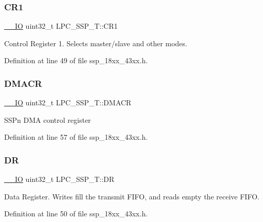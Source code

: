 \subsubsection{\texorpdfstring{C\+R1}{CR1}}
{\footnotesize\ttfamily \hyperlink{core__sc300_8h_aec43007d9998a0a0e01faede4133d6be}{\+\_\+\+\_\+\+IO} uint32\+\_\+t L\+P\+C\+\_\+\+S\+S\+P\+\_\+\+T\+::\+C\+R1}

Control Register 1. Selects master/slave and other modes. 

Definition at line 49 of file ssp\+\_\+18xx\+\_\+43xx.\+h.

\mbox{\label{struct_l_p_c___s_s_p___t_a6a74b0cbac37f424e198ccef9a208d65}} 
\subsubsection{\texorpdfstring{D\+M\+A\+CR}{DMACR}}
{\footnotesize\ttfamily \hyperlink{core__sc300_8h_aec43007d9998a0a0e01faede4133d6be}{\+\_\+\+\_\+\+IO} uint32\+\_\+t L\+P\+C\+\_\+\+S\+S\+P\+\_\+\+T\+::\+D\+M\+A\+CR}

S\+S\+Pn D\+MA control register 

Definition at line 57 of file ssp\+\_\+18xx\+\_\+43xx.\+h.

\mbox{\label{struct_l_p_c___s_s_p___t_a7a32964f3ca72981b80cf4012c515ea8}} 
\subsubsection{\texorpdfstring{DR}{DR}}
{\footnotesize\ttfamily \hyperlink{core__sc300_8h_aec43007d9998a0a0e01faede4133d6be}{\+\_\+\+\_\+\+IO} uint32\+\_\+t L\+P\+C\+\_\+\+S\+S\+P\+\_\+\+T\+::\+DR}

Data Register. Writes fill the transmit F\+I\+FO, and reads empty the receive F\+I\+FO. 

Definition at line 50 of file ssp\+\_\+18xx\+\_\+43xx.\+h.

\mbox{\label{struct_l_p_c___s_s_p___t_ad788fb9f7178c7a79588b429f74b9946}} 
